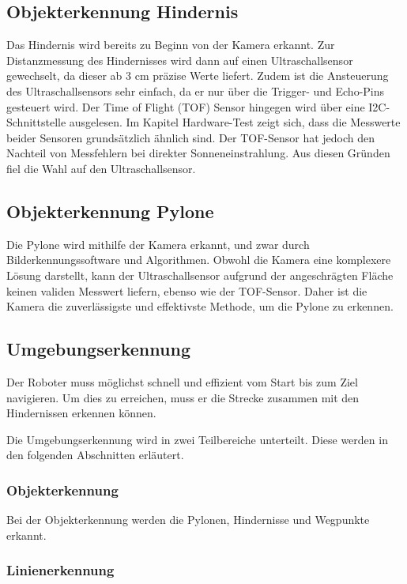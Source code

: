 \documentclass[../main.tex]{subfiles}
\begin{document}
\subsection{Objekterkennung Hindernis}
Das Hindernis wird bereits zu Beginn von der Kamera erkannt. Zur Distanzmessung des Hindernisses wird dann auf einen Ultraschallsensor gewechselt, da dieser ab 3 cm präzise Werte liefert. Zudem ist die Ansteuerung des Ultraschallsensors sehr einfach, da er nur über die Trigger- und Echo-Pins gesteuert wird. Der Time of Flight (TOF) Sensor hingegen wird über eine I2C-Schnittstelle ausgelesen. Im Kapitel Hardware-Test zeigt sich, dass die Messwerte beider Sensoren grundsätzlich ähnlich sind. Der TOF-Sensor hat jedoch den Nachteil von Messfehlern bei direkter Sonneneinstrahlung. Aus diesen Gründen fiel die Wahl auf den Ultraschallsensor.


\subsection{Objekterkennung Pylone}
Die Pylone wird mithilfe der Kamera erkannt, und zwar durch Bilderkennungssoftware und Algorithmen. Obwohl die Kamera eine komplexere Lösung darstellt, kann der Ultraschallsensor aufgrund der angeschrägten Fläche keinen validen Messwert liefern, ebenso wie der TOF-Sensor. Daher ist die Kamera die zuverlässigste und effektivste Methode, um die Pylone zu erkennen.

\subsection{Umgebungserkennung}

Der Roboter muss möglichst schnell und effizient vom Start bis zum Ziel navigieren.
Um dies zu erreichen, muss er die Strecke zusammen mit den Hindernissen erkennen können.

Die Umgebungserkennung wird in zwei Teilbereiche unterteilt. Diese werden in den folgenden Abschnitten erläutert.

\subsubsection{Objekterkennung}

Bei der Objekterkennung werden die Pylonen, Hindernisse und Wegpunkte erkannt.

\subsubsection{Linienerkennung}
\end{document}
